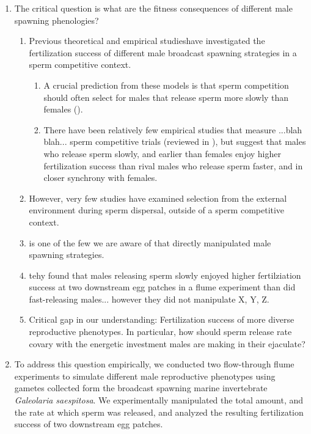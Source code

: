 \documentclass{article}
\begin{document}
\begin{enumerate}
	\item The critical question is what are the fitness consequences of different male spawning phenologies?
		\begin{enumerate}
			\item Previous theoretical and empirical studieshave investigated the fertilization success of different male broadcast spawning strategies in a sperm competitive context.
			\begin{enumerate}
				\item A crucial prediction from these models is that sperm competition should often select for males that release sperm more slowly than females (\citealt{BodeMarshall2007, Olito2015, Olito2017}).
				\item There have been relatively few empirical studies that measure ...blah blah... sperm competitive trials (reviewed in \citealt{LotterhosLevitan2011}), but suggest that males who release sperm slowly, and earlier than females enjoy higher fertilization success than rival males who release sperm faster, and in closer synchrony with females.
			\end{enumerate}
			\item However, very few studies have examined selection from the external environment during sperm dispersal, outside of a sperm competitive context.
			\item \citet{BodeMarshall2007} is one of the few we are aware of that directly manipulated male spawning strategies.
			\item tehy found that males releasing sperm slowly enjoyed higher fertilziation success at two downstream egg patches in a flume experiment than did fast-releasing males... however they did not manipulate X, Y, Z.
			\item Critical gap in our understanding: Fertilization success of more diverse reproductive phenotypes. In particular, how should sperm release rate covary with the energetic investment males are making in their ejaculate?
		\end{enumerate}
	\item To address this question empirically, we conducted two flow-through flume experiments to simulate different male reproductive phenotypes using gametes collected form the broadcast spawning marine invertebrate \textit{Galeolaria saespitosa}. We experimentally manipulated the total amount, and the rate at which sperm was released, and analyzed the resulting fertilization success of two downstream egg patches.
		\begin{enumerate}

\end{enumerate}
\end{enumerate}
\end{document}
